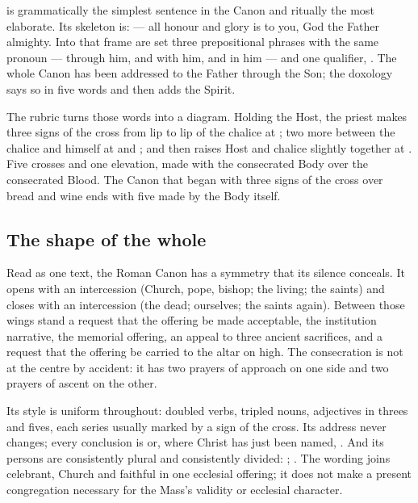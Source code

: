  is grammatically the simplest sentence in the Canon and
ritually the most elaborate. Its skeleton is:  --- all honour and glory is to you, God the
Father almighty. Into that frame are set three prepositional phrases with the
same pronoun --- through him, and with him, and in him --- and one qualifier,
. The whole Canon has been addressed to the
Father through the Son; the doxology says so in five words and then adds the
Spirit.

The rubric turns those words into a diagram. Holding the Host, the priest makes
three signs of the cross from lip to lip of the chalice at ; two more between the chalice and himself at
 and ; and
then raises Host and chalice slightly together at . Five crosses and one elevation, made with the consecrated Body over
the consecrated Blood. The Canon that began with three signs of the cross over
bread and wine ends with five made by the Body itself.

\subsection*{The shape of the whole}

Read as one text, the Roman Canon has a symmetry that its silence conceals. It
opens with an intercession (Church, pope, bishop; the living; the saints) and
closes with an intercession (the dead; ourselves; the saints again). Between
those wings stand a request that the offering be made acceptable, the
institution narrative, the memorial offering, an appeal to three ancient
sacrifices, and a request that the offering be carried to the altar on high.
The consecration is not at the centre by accident: it has two prayers of
approach on one side and two prayers of ascent on the other.

Its style is uniform throughout: doubled verbs, tripled nouns, adjectives in
threes and fives, each series usually marked by a sign of the cross. Its
address never changes; every conclusion is  or, where Christ has just been named, . And its
persons are consistently plural and consistently divided: ; . The wording joins celebrant, Church and faithful in one
ecclesial offering; it does not make a present congregation necessary for the
Mass's validity or ecclesial character.
